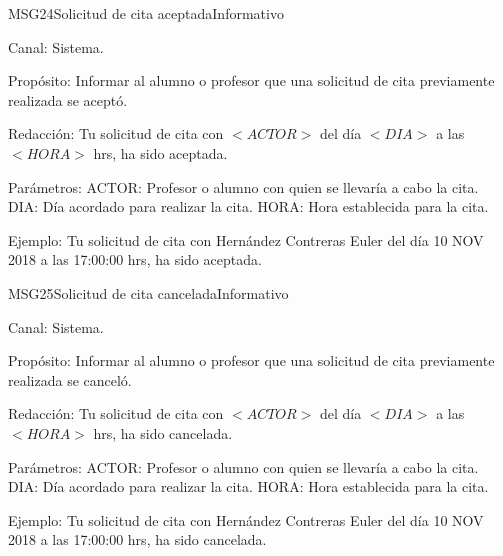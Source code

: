 \begin{mensaje}{MSG24}{Solicitud de cita aceptada}{Informativo}
	\item[Canal:] Sistema.
    \item[Propósito:] Informar al alumno o profesor que una solicitud de cita previamente realizada se aceptó. 
    \item[Redacción:] Tu solicitud de cita con $<ACTOR>$ del día $<DIA>$ a las $<HORA>$ hrs, ha sido aceptada. 
    \item[Parámetros:] ACTOR: Profesor o alumno con quien se llevaría a cabo la cita. DIA: Día acordado para realizar la cita. HORA: Hora establecida para la cita.
    \item[Ejemplo:] Tu solicitud de cita con Hernández Contreras Euler del día 10 NOV 2018 a las 17:00:00 hrs, ha sido aceptada. 
\end{mensaje}

\begin{mensaje}{MSG25}{Solicitud de cita cancelada}{Informativo}
	\item[Canal:] Sistema.
    \item[Propósito:] Informar al alumno o profesor que una solicitud de cita previamente realizada se canceló. 
    \item[Redacción:] Tu solicitud de cita con $<ACTOR>$ del día $<DIA>$ a las $<HORA>$ hrs, ha sido cancelada. 
    \item[Parámetros:] ACTOR: Profesor o alumno con quien se llevaría a cabo la cita. DIA: Día acordado para realizar la cita. HORA: Hora establecida para la cita.
    \item[Ejemplo:] Tu solicitud de cita con Hernández Contreras Euler del día 10 NOV 2018 a las 17:00:00 hrs, ha sido cancelada. 
\end{mensaje}